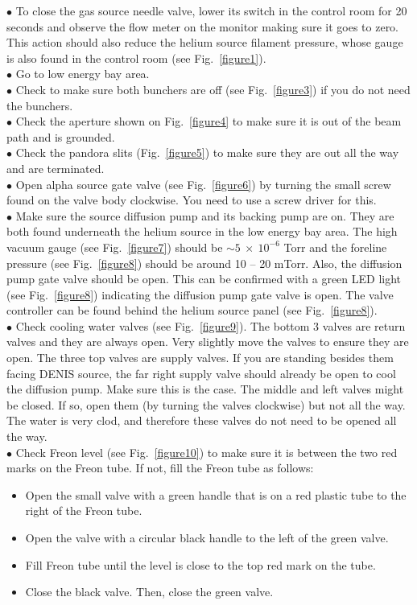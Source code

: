 \documentclass{article}
\begin{document}
$\bullet$ To close the gas source needle valve, lower its switch in the control room for 20 seconds and observe the flow meter on the monitor making sure it goes to zero. This action should also reduce the helium source filament pressure, whose gauge is also found in the control room (see Fig.~\ref{figure1}).\\
$\bullet$ Go to low energy bay area.\\
$\bullet$ Check to make sure both bunchers are off (see Fig.~\ref{figure3}) if you do not need the bunchers.\\
$\bullet$ Check the aperture shown on Fig.~\ref{figure4} to make sure it is out of the beam path and is grounded.\\
$\bullet$ Check the pandora slits (Fig.~\ref{figure5}) to make sure they are out all the way and are terminated.\\
$\bullet$ Open alpha source gate valve (see Fig.~\ref{figure6}) by turning the small screw found on the valve body clockwise. You need to use a screw driver for this.\\
$\bullet$ Make sure the source diffusion pump and its backing pump are on. They are both found underneath the helium source in the low energy bay area. The high vacuum gauge (see Fig.~\ref{figure7}) should be $\sim5~\times~10^{-6}$ Torr and the foreline pressure (see Fig.~\ref{figure8}) should be around 10 -- 20 mTorr. Also, the diffusion pump gate valve should be open. This can be confirmed  with a green LED light (see Fig.~\ref{figure8}) indicating the diffusion pump gate valve is open. The valve controller can be found behind the helium source panel (see Fig.~\ref{figure8}).\\
$\bullet$ Check cooling water valves (see Fig.~\ref{figure9}). The bottom 3 valves are return valves and they are always open. Very slightly move the valves to ensure they are open. The three top valves are supply valves. If you are standing besides them facing DENIS source, the far right supply valve should already be open to cool the diffusion pump. Make sure this is the case. The middle and left valves might be closed. If so, open them (by turning the valves clockwise) but not all the way. The water is very clod, and therefore these valves do not need to be opened all the way.\\
$\bullet$ Check Freon level (see Fig.~\ref{figure10}) to make sure it is between the two red marks on the Freon tube. If not, fill the Freon tube as follows:
\begin{itemize}
  \item Open the small valve with a green handle that is on a red plastic tube to the right of the Freon tube.
  \item Open the valve with a circular black handle to the left of the green valve.
  \item Fill Freon tube until the level is close to the top red mark on the tube.
  \item Close the black valve. Then, close the green valve.
\end{itemize}
\end{document}
